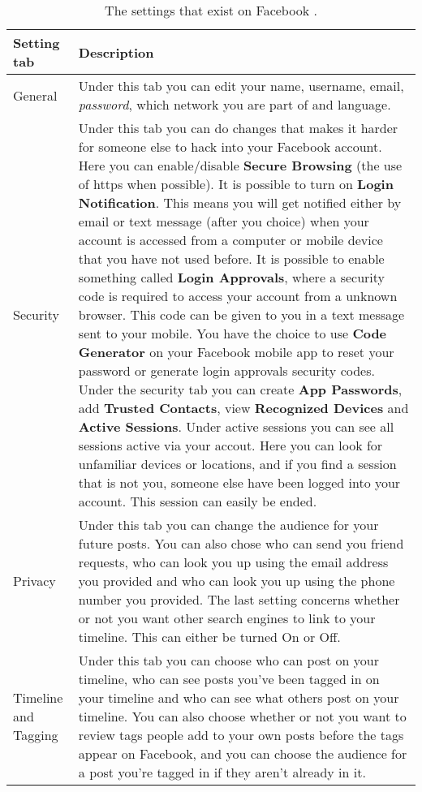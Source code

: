 \begin{center}
    \begin{longtable}{ | l | p{9cm} |}
    \caption{\label{tab:settings}The settings that exist on Facebook 				\cite{facebooksettings}.} \\
    \hline
    \textbf{Setting tab} & \textbf{Description} \\ 
    \hline
    General & Under this tab you can edit your name, username, email, \textit{password}, which network you are part of and language. \\
    \hline
    Security & Under this tab you can do changes that makes it harder for someone else to hack into your Facebook account. Here you can enable/disable \textbf{Secure Browsing} (the use of https when possible). It is possible to turn on \textbf{Login Notification}. This means you will get notified either by email or text message (after you choice) when your account is accessed from a computer or mobile device that you have not used before. It is possible to enable something called \textbf{Login Approvals}, where a security code is required to access your account from a unknown browser. This code can be given to you in a text message sent to your mobile. You have the choice to use \textbf{Code Generator} on your Facebook mobile app to reset your password or generate login approvals security codes. Under the security tab you can create \textbf{App Passwords}, add \textbf{Trusted Contacts}, view \textbf{Recognized Devices} and \textbf{Active Sessions}. Under active sessions you can see all sessions active via your accout. Here you can look for unfamiliar devices or locations, and if you find a session that is not you, someone else have been logged into your account. This session can easily be ended. \\ 
    \hline
    Privacy & Under this tab you can change the audience for your future posts. You can also chose who can send you friend requests, who can look you up using the email address you provided and who can look you up using the phone number you provided. The last setting concerns whether or not you want other search engines to link to your timeline. This can either be turned On or Off.\\
    \hline
    Timeline and Tagging & Under this tab you can choose who can post on your timeline, who can see posts you've been tagged in on your timeline and who can see what others post on your timeline. You can also choose whether or not you want to review tags people add to your own posts before the tags appear on Facebook, and you can choose the audience for a post you're tagged in if they aren't already in it.\\

\end{longtable}
\end{center}
